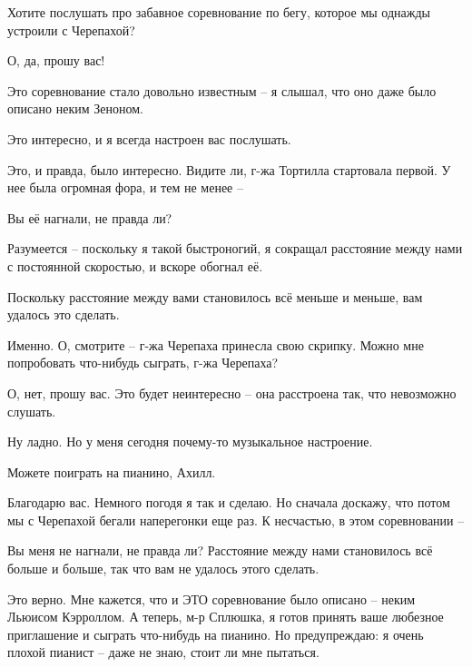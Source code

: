 \documentclass[../main.tex]{subfiles}
\begin{document}


\begin{dialogue}

 Хотите послушать про забавное соревнование по бегу, которое мы однажды устроили с Черепахой?

 О, да, прошу вас!

 Это соревнование стало довольно известным \--- я слышал, что оно даже было описано неким Зеноном.

 Это интересно, и я всегда настроен вас послушать.

 Это, и правда, было интересно. Видите ли, г-жа Тортилла стартовала первой. У нее была огромная фора, и тем не менее \---

 Вы её нагнали, не правда ли?

 Разумеется \--- поскольку я такой быстроногий, я сокращал расстояние между нами с постоянной скоростью, и вскоре обогнал её.

 Поскольку расстояние между вами становилось всё меньше и меньше, вам удалось это сделать.

 Именно. О, смотрите \--- г-жа Черепаха принесла свою скрипку. Можно мне попробовать что-нибудь сыграть, г-жа Черепаха?

 О, нет, прошу вас. Это будет неинтересно \--- она расстроена так, что невозможно слушать.

 Ну ладно. Но у меня сегодня почему-то музыкальное настроение.

 Можете поиграть на пианино, Ахилл.

 Благодарю вас. Немного погодя я так и сделаю. Но сначала доскажу, что потом мы с Черепахой бегали наперегонки еще раз. К несчастью, в этом соревновании \---

 Вы меня не нагнали, не правда ли? Расстояние между нами становилось всё больше и больше, так что вам не удалось этого сделать.

 Это верно. Мне кажется, что и ЭТО соревнование было описано \--- неким Льюисом Кэрроллом. А теперь, м-р Сплюшка, я готов принять ваше любезное приглашение и сыграть что-нибудь на пианино. Но предупреждаю: я очень плохой пианист \--- даже не знаю, стоит ли мне пытаться.


\end{dialogue}
\end{document}
